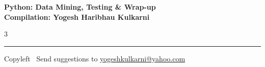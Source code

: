 \documentclass[8pt,landscape]{article}
\begin{document}
\footnotesize


\begin{center}
\Large{\textbf{Python: Data Mining, Testing \& Wrap-up\\ Compilation: Yogesh Haribhau Kulkarni}}
\end{center}

\begin{multicols}{3}

\end{multicols}

\rule{\linewidth}{0.25pt}
\scriptsize
Copyleft \textcopyleft\  Send suggestions to
\href{http://www.yogeshkulkarni.com}{yogeshkulkarni@yahoo.com}
\end{document}
